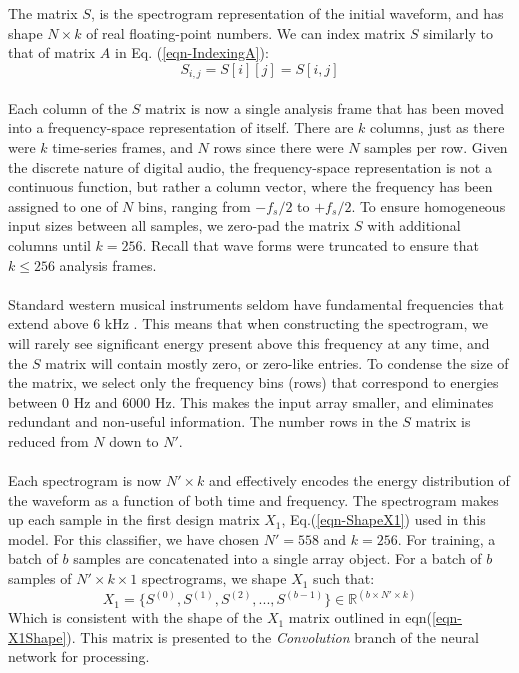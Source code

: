 \documentclass[12pt,letterpaper]{article}
\begin{document}
The matrix $S$, is the spectrogram representation of the initial waveform, and has shape $N \times k$ of real floating-point numbers. We can index matrix $S$ similarly to that of matrix $A$ in Eq. (\ref{eqn-IndexingA}):
\begin{equation}
\label{eqn-IndexingS}
S_{i,j} = S[i][j] = S[i,j]
\end{equation}

\paragraph*{}Each column of the $S$ matrix is now a single analysis frame that has been moved into a frequency-space representation of itself. There are $k$ columns, just as there were $k$ time-series frames, and $N$ rows since there were $N$ samples per row. Given the discrete nature of digital audio, the frequency-space representation is not a continuous function, but rather a column vector, where the frequency has been assigned to one of $N$ bins, ranging from $-f_s / 2$ to $+f_s/2$. To ensure homogeneous input sizes between all samples, we zero-pad the matrix $S$ with additional columns until $k = 256$. Recall that wave forms were truncated to ensure that $k \leq 256$ analysis frames.

\paragraph*{}Standard western musical instruments seldom have fundamental frequencies that extend above $6$ kHz \cite{Olson,Virtanen,White}. This means that when constructing the spectrogram, we will rarely see significant energy present above this frequency at any time, and the $S$ matrix will contain mostly zero, or zero-like entries. To condense the size of the matrix, we select only the frequency bins (rows) that correspond to energies between $0$ Hz and $6000$ Hz. This makes the input array smaller, and eliminates redundant and non-useful information. The number rows in the $S$ matrix is reduced from $N$ down to $N'$. 

\paragraph*{}Each spectrogram is now $N' \times k$ and effectively encodes the energy distribution of the waveform as a function of both time and frequency. The spectrogram makes up each sample in the first design matrix $X_1$, Eq.(\ref{eqn-ShapeX1}) used in this model. For this classifier, we have chosen $N' = 558$ and $k = 256$. For training, a batch of $b$ samples are concatenated into a single array object. For a batch of $b$ samples of $N' \times k \times 1$ spectrograms, we shape $X_1$ such that:
\begin{equation}
\label{eqn-X1}
X_1 = \big\{ S^{(0)},S^{(1)},S^{(2)}, ... , S^{(b-1)} \big\} \in \mathbb{R}^{(b \times N' \times k)}
\end{equation}
Which is consistent with the shape of the $X_1$ matrix outlined in eqn(\ref{eqn-X1Shape}). This matrix is presented to the \textit{Convolution} branch of the neural network for processing.
\end{document}
